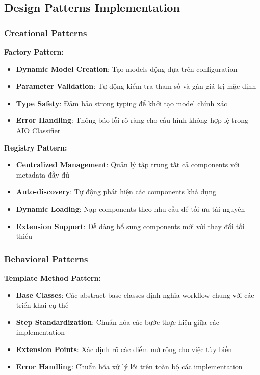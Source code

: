 \subsection{Design Patterns Implementation}\label{subsec:design-patterns}

\subsubsection{Creational Patterns}\label{subsec:creational-patterns}

\textbf{Factory Pattern:}
\begin{itemize}
    \item \textbf{Dynamic Model Creation}: Tạo models động dựa trên configuration
    \item \textbf{Parameter Validation}: Tự động kiểm tra tham số và gán giá trị mặc định
    \item \textbf{Type Safety}: Đảm bảo strong typing để khởi tạo model chính xác
    \item \textbf{Error Handling}: Thông báo lỗi rõ ràng cho cấu hình không hợp lệ trong AIO Classifier
\end{itemize}

\textbf{Registry Pattern:}
\begin{itemize}
    \item \textbf{Centralized Management}: Quản lý tập trung tất cả components với metadata đầy đủ
    \item \textbf{Auto-discovery}: Tự động phát hiện các components khả dụng
    \item \textbf{Dynamic Loading}: Nạp components theo nhu cầu để tối ưu tài nguyên
    \item \textbf{Extension Support}: Dễ dàng bổ sung components mới với thay đổi tối thiểu
\end{itemize}

\subsubsection{Behavioral Patterns}

\textbf{Template Method Pattern:}
\begin{itemize}
    \item \textbf{Base Classes}: Các abstract base classes định nghĩa workflow chung với các triển khai cụ thể
    \item \textbf{Step Standardization}: Chuẩn hóa các bước thực hiện giữa các implementation
    \item \textbf{Extension Points}: Xác định rõ các điểm mở rộng cho việc tùy biến
    \item \textbf{Error Handling}: Chuẩn hóa xử lý lỗi trên toàn bộ các implementation
\end{itemize}

